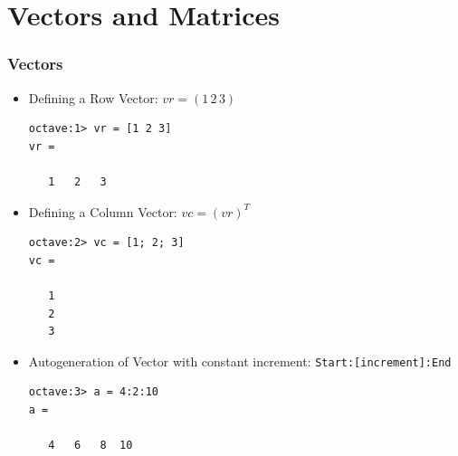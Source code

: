 \documentclass[t,compress,xcolor=svgnames]{beamer}
\begin{document}
\section{Vectors and Matrices}
\begin{frame}[fragile]
  \frametitle{\small Vectors}
  \begin{itemize}
    \item Defining a Row Vector: $vr = (1\,2\,3)$
    \begin{verbatim}
octave:1> vr = [1 2 3]
vr =

   1   2   3
    \end{verbatim}
    \item Defining a Column Vector: $vc = (vr)^T$ 
    \begin{verbatim}
octave:2> vc = [1; 2; 3]
vc =

   1
   2
   3
    \end{verbatim}
    \item Autogeneration of Vector with constant increment: \texttt{Start:[increment]:End}
    \begin{verbatim}
octave:3> a = 4:2:10
a =

   4   6   8  10
    \end{verbatim}
  \end{itemize}
\end{frame}
\end{document}

